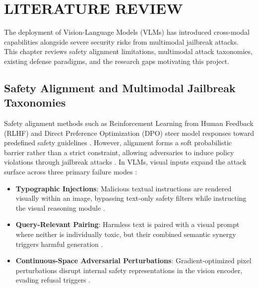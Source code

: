 \chapter{LITERATURE REVIEW}

The deployment of Vision-Language Models (VLMs) has introduced cross-modal capabilities alongside severe security risks from multimodal jailbreak attacks. This chapter reviews safety alignment limitations, multimodal attack taxonomies, existing defense paradigms, and the research gaps motivating this project.

\section{Safety Alignment and Multimodal Jailbreak Taxonomies}
Safety alignment methods such as Reinforcement Learning from Human Feedback (RLHF) and Direct Preference Optimization (DPO) steer model responses toward predefined safety guidelines \cite{Jalan2026SurveyLLM, Chen2026JailbreakingL}. However, alignment forms a soft probabilistic barrier rather than a strict constraint, allowing adversaries to induce policy violations through jailbreak attacks \cite{Zhang2025JailGuard, Kushnerov2026Benchmarking}. In VLMs, visual inputs expand the attack surface across three primary failure modes \cite{Weng2025MMJBBench, Chen2026JailbreakingL}:
\begin{itemize}
    \item \textbf{Typographic Injections}: Malicious textual instructions are rendered visually within an image, bypassing text-only safety filters while instructing the visual reasoning module \cite{Weng2025MMJBBench, hua2026rethinking}.
    \item \textbf{Query-Relevant Pairing}: Harmless text is paired with a visual prompt where neither is individually toxic, but their combined semantic synergy triggers harmful generation \cite{Weng2025MMJBBench, Liang2025LearningTD}.
    \item \textbf{Continuous-Space Adversarial Perturbations}: Gradient-optimized pixel perturbations disrupt internal safety representations in the vision encoder, evading refusal triggers \cite{Kushnerov2026Benchmarking, Zhu2026PrincipledSV}.
\end{itemize}

